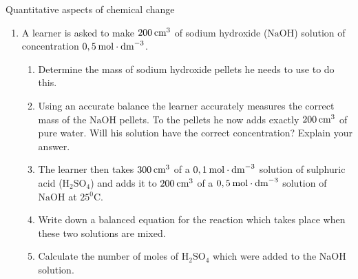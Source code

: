 \begin{eocexercises}{Quantitative aspects of chemical change}
\begin{enumerate}[noitemsep, label=\textbf{\arabic*}. ]
\label{m38712*id286663}\begin{enumerate}[noitemsep, label=\textbf{\alph*}. ] 
            \label{m38712*uid148}\item Write down a balanced equation for the reaction which takes place when these two solutions are mixed.
\label{m38712*uid149}\item Calculate the number of moles of sulphuric acid which were added to the sodium hydroxide solution.
\label{m38712*uid150}\item Is the number of moles of sulphuric acid enough to fully neutralise the sodium hydroxide solution? Support your answer by showing all relevant calculations.
(IEB Paper 2 2004)
\end{enumerate}
                \label{m38712*uid155}\item A learner is asked to make $200\phantom{\rule{2pt}{0ex}}{\text{cm}}^{3}$ of sodium hydroxide ($\text{NaOH}$) solution of concentration $0,5\phantom{\rule{2pt}{0ex}}\text{mol}\ensuremath{\cdot}{\text{dm}}^{-3}$.
\label{m38712*id286969}\begin{enumerate}[noitemsep, label=\textbf{\alph*}. ] 
            \label{m38712*uid156}\item Determine the mass of sodium hydroxide pellets he needs to use to do this.
\label{m38712*uid157}\item Using an accurate balance the learner accurately measures the correct mass of the $\text{NaOH}$ pellets. To the pellets he now adds exactly $200\phantom{\rule{2pt}{0ex}}{\text{cm}}^{3}$ of pure water. Will his solution have the correct concentration? Explain your answer.\item The learner then takes $300\phantom{\rule{2pt}{0ex}}{\text{cm}}^{3}$ of a $0,1\phantom{\rule{2pt}{0ex}}\text{mol}\ensuremath{\cdot}{\text{dm}}^{-3}$ solution of sulphuric acid ($\text{H}{}_{2}\text{SO}{}_{4}$) and adds it to $200\phantom{\rule{2pt}{0ex}}{\text{cm}}^{3}$ of a $0,5\phantom{\rule{2pt}{0ex}}\text{mol}\ensuremath{\cdot}{\text{dm}}^{-3}$ solution of $\text{NaOH}$ at $25{}^{0}\text{C}$.
\label{m38712*uid158}\item Write down a balanced equation for the reaction which takes place when these two solutions are mixed.
\label{m38712*uid159}\item Calculate the number of moles of $\text{H}{}_{2}\text{SO}{}_{4}$ which were added to the NaOH solution.

\end{enumerate}
\end{enumerate}
\end{eocexercises}
